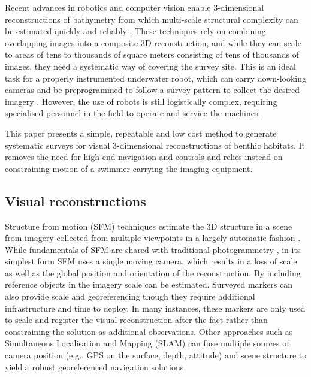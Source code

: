 Recent advances in robotics and computer vision enable 3-dimensional reconstructions of bathymetry from which multi-scale structural complexity can be estimated quickly and reliably \cite{Friedman_2012}. These techniques rely on combining overlapping images into a composite 3D reconstruction, and while they can scale to areas of tens to thousands of square meters consisting of tens of thousands of images, they need a systematic way of covering the survey site. This is an ideal task for a properly instrumented underwater robot, which can carry down-looking cameras and be preprogrammed to follow a survey pattern to collect the desired imagery \cite{Williams_2012}. However, the use of robots is still logistically complex, requiring specialised personnel in the field to operate and service the machines. 

This paper presents a simple, repeatable and low cost method to generate systematic surveys for visual 3-dimensional reconstructions of benthic habitats. It removes the need for high end navigation and controls and relies instead on constraining motion of a swimmer carrying the imaging equipment. 

\subsection{Visual reconstructions} \label{sec:VisRec}

Structure from motion (SFM) techniques estimate the 3D structure in a scene from imagery collected from multiple viewpoints in a largely automatic fashion \cite{Hartley_2004}. While fundamentals of SFM are shared with traditional photogrammetry \cite{Jones_1982}, in its simplest form SFM uses a single moving camera, which results in a loss of scale as well as the global position and orientation of the reconstruction. By including reference objects in the imagery scale can be estimated. Surveyed markers can also provide scale and georeferencing though they require additional infrastructure and time to deploy. In many instances, these markers are only used to scale and register the visual reconstruction after the fact rather than constraining the solution as additional observations.
Other approaches such as Simultaneous Localisation and Mapping (SLAM) \cite{Thrun_2008} can fuse multiple sources of camera position (e.g., GPS on the surface, depth, attitude) and scene structure to yield a robust georeferenced navigation solutions.

